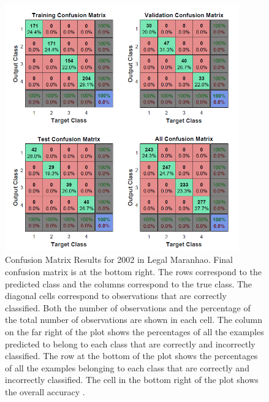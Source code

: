 \begin{figure}[htpb]
 \centering
\includegraphics[width=0.9\textwidth]{Chapter2/2002_CM_Fev_ML_N.png}
\caption[Confusion Matrix Results for 2002 in Legal Maranhao]{Confusion Matrix Results for 2002 in Legal Maranhao. Final confusion matrix is at the bottom right. The rows correspond to the predicted class and the columns correspond to the true class. The diagonal cells correspond to observations that are correctly classified. Both the number of observations and the percentage of the total number of observations are shown in each cell. The column on the far right of the plot shows the percentages of all the examples predicted to belong to each class that are correctly and incorrectly classified. The row at the bottom of the plot shows the percentages of all the examples belonging to each class that are correctly and incorrectly classified. The cell in the bottom right of the plot shows the overall accuracy \citep{matlab_2017}.}
\end{figure}

